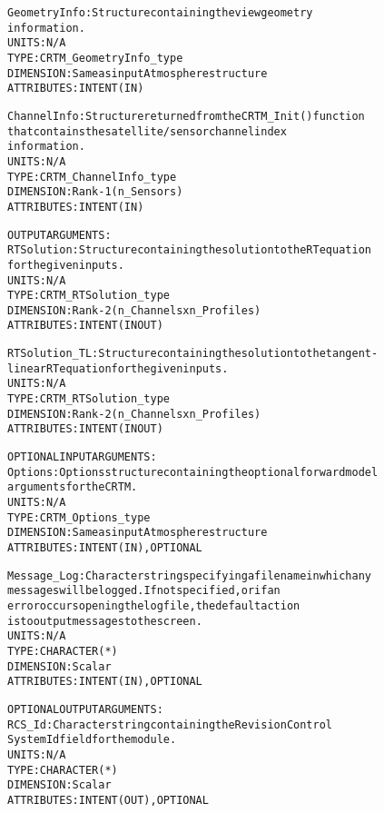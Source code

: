 \begin{alltt}
        GeometryInfo:   Structure containing the view geometry
                        information.
                        UNITS:      N/A
                        TYPE:       CRTM_GeometryInfo_type
                        DIMENSION:  Same as input Atmosphere structure
                        ATTRIBUTES: INTENT(IN)
 
        ChannelInfo:    Structure returned from the CRTM_Init() function
                        that contains the satellite/sensor channel index
                        information.
                        UNITS:      N/A
                        TYPE:       CRTM_ChannelInfo_type
                        DIMENSION:  Rank-1 (n_Sensors)
                        ATTRIBUTES: INTENT(IN)
 
  OUTPUT ARGUMENTS:
        RTSolution:     Structure containing the solution to the RT equation
                        for the given inputs.
                        UNITS:      N/A
                        TYPE:       CRTM_RTSolution_type
                        DIMENSION:  Rank-2 (n_Channels x n_Profiles)
                        ATTRIBUTES: INTENT(IN OUT)
 
        RTSolution_TL:  Structure containing the solution to the tangent-
                        linear RT equation for the given inputs.
                        UNITS:      N/A
                        TYPE:       CRTM_RTSolution_type
                        DIMENSION:  Rank-2 (n_Channels x n_Profiles)
                        ATTRIBUTES: INTENT(IN OUT)
 
  OPTIONAL INPUT ARGUMENTS:
        Options:        Options structure containing the optional forward model
                        arguments for the CRTM.
                        UNITS:      N/A
                        TYPE:       CRTM_Options_type
                        DIMENSION:  Same as input Atmosphere structure
                        ATTRIBUTES: INTENT(IN), OPTIONAL
 
        Message_Log:    Character string specifying a filename in which any
                        messages will be logged. If not specified, or if an
                        error occurs opening the log file, the default action
                        is to output messages to the screen.
                        UNITS:      N/A
                        TYPE:       CHARACTER(*)
                        DIMENSION:  Scalar
                        ATTRIBUTES: INTENT(IN), OPTIONAL
 
  OPTIONAL OUTPUT ARGUMENTS:
        RCS_Id:         Character string containing the Revision Control
                        System Id field for the module.
                        UNITS:      N/A
                        TYPE:       CHARACTER(*)
                        DIMENSION:  Scalar
                        ATTRIBUTES: INTENT(OUT), OPTIONAL
 

\end{alltt}
